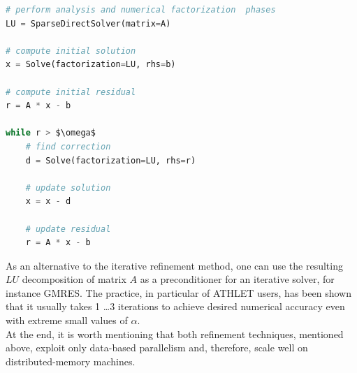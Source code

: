 \begin{minipage}{\linewidth}

\begin{lstlisting}[language=python, caption={Iterative refinement}, frame=single, label={lst:iterative-refinement}]
# perform analysis and numerical factorization  phases
LU = SparseDirectSolver(matrix=A)

# compute initial solution
x = Solve(factorization=LU, rhs=b)

# compute initial residual
r = A * x - b

while r > $\omega$
	# find correction
	d = Solve(factorization=LU, rhs=r)
	
	# update solution
	x = x - d
	
	# update residual
	r = A * x - b
\end{lstlisting}
\end{minipage}


As an alternative to the iterative refinement method, one can use the resulting $LU$ decomposition of matrix $A$ as a preconditioner for an iterative solver, for instance GMRES. The practice, in particular of ATHLET users, has been shown that it usually takes 1 \dots 3 iterations to achieve desired numerical accuracy even with extreme small values of $\alpha$.\\

At the end, it is worth mentioning that both refinement techniques, mentioned above, exploit only data-based parallelism and, therefore, scale well on distributed-memory machines.\\